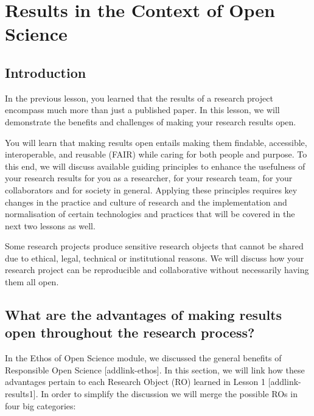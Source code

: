\documentclass[
  letterpaper,
  DIV=11,
  numbers=noendperiod]{scrreport}
\begin{document}
\hypertarget{results-in-the-context-of-open-science}{%
\chapter{Results in the Context of Open
Science}\label{results-in-the-context-of-open-science}}

\hypertarget{introduction-16}{%
\section{Introduction}\label{introduction-16}}

In the previous lesson, you learned that the results of a research
project encompass much more than just a published paper. In this lesson,
we will demonstrate the benefits and challenges of making your research
results open.

You will learn that making results open entails making them findable,
accessible, interoperable, and reusable (FAIR) while caring for both
people and purpose. To this end, we will discuss available guiding
principles to enhance the usefulness of your research results for you as
a researcher, for your research team, for your collaborators and for
society in general. Applying these principles requires key changes in
the practice and culture of research and the implementation and
normalisation of certain technologies and practices that will be covered
in the next two lessons as well.

Some research projects produce sensitive research objects that cannot be
shared due to ethical, legal, technical or institutional reasons. We
will discuss how your research project can be reproducible and
collaborative without necessarily having them all open.

\hypertarget{what-are-the-advantages-of-making-results-open-throughout-the-research-process}{%
\section{\texorpdfstring{What are the \textbf{advantages} of making
results open throughout the research
process?}{What are the advantages of making results open throughout the research process?}}\label{what-are-the-advantages-of-making-results-open-throughout-the-research-process}}

In the Ethos of Open Science module, we discussed the general benefits
of Responsible Open Science {[}addlink-ethos{]}. In this section, we
will link how these advantages pertain to each Research Object (RO)
learned in Lesson 1 {[}addlink-results1{]}. In order to simplify the
discussion we will merge the possible ROs in four big categories:
\end{document}
